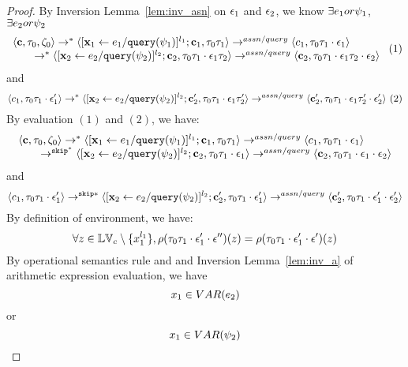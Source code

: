 \begin{proof}
%
By Inversion Lemma~\ref{lem:inv_asn} on 
 $\mathtt{\epsilon}_1$ and $\mathtt{\epsilon}_2$, we know $\exists e_1 or \psi_1$, $\exists e_2 or \psi_2$
 \[
  \begin{array}{l}   
\langle {\boldsymbol{\mathbf{c}}}, \mathtt{\tau}_0, \mathtt{\zeta}_0 \rangle \rightarrow^{*} 
\langle [\mathrel{ {\boldsymbol{\mathbf{x}}}_1 \leftarrow e_1 / {\tt query}(\psi_1) }]^{l_1} ; {\boldsymbol{\mathbf{c}}}_1, \mathtt{\tau}_0 \mathtt{\tau}_1 \rangle  
\rightarrow^{assn/query}
 \langle c_1, \mathtt{\tau}_0 \mathtt{\tau}_1 \cdot \mathtt{\epsilon}_1 \rangle \\
  \qquad \rightarrow^{*} 
  \langle [\mathrel{ {\boldsymbol{\mathbf{x}}}_2 \leftarrow e_2 / {\tt query}(\psi_2) }]^{l_2};{\boldsymbol{\mathbf{c}}}_2, 
  \mathtt{\tau}_0 \mathtt{\tau}_1 \cdot \mathtt{\epsilon}_1 \mathtt{\tau}_2 \rangle 
  \rightarrow^{assn/query} 
  \langle {\boldsymbol{\mathbf{c}}}_2,  \mathtt{\tau}_0 \mathtt{\tau}_1 \cdot \mathtt{\epsilon}_1 \mathtt{\tau}_2 \cdot \mathtt{\epsilon}_2 \rangle 
\end{array} ~ (1)
 \]
 and 
  \[
  \langle c_1, \mathtt{\tau}_0 \mathtt{\tau}_1 \cdot \mathtt{\epsilon}_1' \rangle 
  \rightarrow^{*} 
  \langle [\mathrel{ {\boldsymbol{\mathbf{x}}}_2 \leftarrow e_2 / {\tt query}(\psi_2) }]^{l_2} ; {\boldsymbol{\mathbf{c}}}_2', \mathtt{\tau}_0 \mathtt{\tau}_1 \cdot \mathtt{\epsilon}_1 \mathtt{\tau}_2' \rangle 
  \rightarrow^{assn/query} 
  \langle {\boldsymbol{\mathbf{c}}}_2',  \mathtt{\tau}_0 \mathtt{\tau}_1 \cdot \mathtt{\epsilon}_1 \mathtt{\tau}_2' \cdot \mathtt{\epsilon}_2' \rangle 
 ~(2)
 \]
%
 By evaluation $(1)$ and $(2)$, we have:
\[
  \begin{array}{l}   
\langle {\boldsymbol{\mathbf{c}}}, \mathtt{\tau}_0, \mathtt{\zeta}_0 \rangle \rightarrow^{*} 
\langle [\mathrel{ {\boldsymbol{\mathbf{x}}}_1 \leftarrow e_1 / {\tt query}(\psi_1) }]^{l_1} ; {\boldsymbol{\mathbf{c}}}_1, \mathtt{\tau}_0 \mathtt{\tau}_1 \rangle  \rightarrow^{assn/query}
 \langle c_1, \mathtt{\tau}_0 \mathtt{\tau}_1 \cdot \mathtt{\epsilon}_1 \rangle \\
  \qquad \rightarrow^{\mathtt{skip}^*} 
  \langle [\mathrel{ {\boldsymbol{\mathbf{x}}}_2 \leftarrow e_2 / {\tt query}(\psi_2) }]^{l_2};{\boldsymbol{\mathbf{c}}}_2, 
  \mathtt{\tau}_0 \mathtt{\tau}_1 \cdot \mathtt{\epsilon}_1 \rangle 
  \rightarrow^{assn/query} 
  \langle {\boldsymbol{\mathbf{c}}}_2,  \mathtt{\tau}_0 \mathtt{\tau}_1 \cdot \mathtt{\epsilon}_1 \cdot \mathtt{\epsilon}_2 \rangle 
\end{array}
 \]
 and 
  \[
  \langle c_1, \mathtt{\tau}_0 \mathtt{\tau}_1 \cdot \mathtt{\epsilon}_1' \rangle 
  \rightarrow^{\mathtt{skip}*} 
  \langle [\mathrel{ {\boldsymbol{\mathbf{x}}}_2 \leftarrow e_2 / {\tt query}(\psi_2) }]^{l_2} ; {\boldsymbol{\mathbf{c}}}_2', \mathtt{\tau}_0 \mathtt{\tau}_1 \cdot \mathtt{\epsilon}_1' \rangle 
  \rightarrow^{assn/query} 
  \langle {\boldsymbol{\mathbf{c}}}_2',  \mathtt{\tau}_0 \mathtt{\tau}_1 \cdot \mathtt{\epsilon}_1' \cdot \mathtt{\epsilon}_2' \rangle 
 \]
%
By definition of environment, we have:
\[
  \forall z \in \mathbb{LV}_c \setminus \{x_1^{l_1}\} ,
  \rho(\mathtt{\tau}_0 \mathtt{\tau}_1 \cdot \mathtt{\epsilon}_1' \cdot \mathtt{\epsilon}'') (z) =  
  \rho(\mathtt{\tau}_0 \mathtt{\tau}_1 \cdot \mathtt{\epsilon}_1' \cdot \mathtt{\epsilon}') (z)
\]
%
By operational semantics rule  and  and {Inversion Lemma~\ref{lem:inv_a}} of arithmetic expression evaluation, we have 
\[
  x_1 \in VAR(e_2)
\]
or
\[
  x_1 \in VAR(\psi_2)
\]
%

\end{proof}
